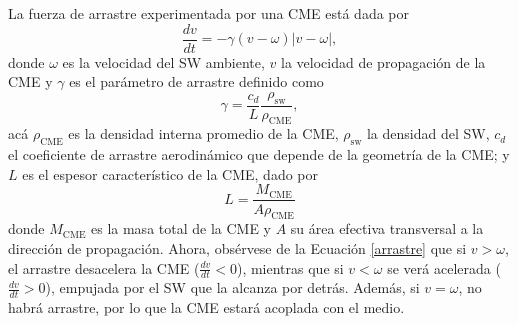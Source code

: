 La fuerza de arrastre experimentada por una CME está dada por
\begin{equation}
\frac{dv}{dt}=-\gamma(v-\omega)|v-\omega|,
\label{arrastre}
\end{equation}
donde $\omega$ es la velocidad del \ac{SW} ambiente, $v$ la velocidad de propagación de la CME y $\gamma$ es el parámetro de arrastre definido como
\begin{equation}
\gamma=\frac{c_d}{L}\frac{\rho_\text{sw}}{\rho_\text{CME}},
\end{equation}
acá $\rho_\text{CME}$ es la densidad interna promedio de la CME, $\rho_\text{sw}$ la densidad del \ac{SW}, $c_d$ el coeficiente de arrastre aerodinámico que depende de la geometría de la CME; y $L$ es el espesor característico de la CME, dado por
\begin{equation}
L=\frac{M_\text{CME}}{A\rho_\text{CME}}
\end{equation}
donde $M_\text{CME}$ es la masa total de la CME y $A$ su área efectiva transversal a la dirección de propagación. Ahora, obsérvese de la Ecuación \eqref{arrastre} que si $v>\omega$, el arrastre desacelera la CME ($\frac{dv}{dt}<0$), mientras que si $v<\omega$ se verá acelerada ($\frac{dv}{dt}>0$), empujada por el \ac{SW} que la alcanza por detrás. Además, si $v=\omega$, no habrá arrastre, por lo que la CME estará acoplada con el medio.

